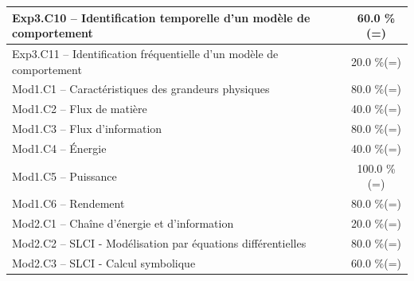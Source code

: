 \begin{center}
\begin{tabular}{|p{.7\linewidth}|c|}
Exp3.C10 -- Identification temporelle d’un modèle de comportement&60.0 \%(=)\\ \hline 
Exp3.C11 -- Identification fréquentielle d’un modèle de comportement&20.0 \%(=)\\ \hline 
Mod1.C1 -- Caractéristiques des grandeurs physiques&80.0 \%(=)\\ \hline 
Mod1.C2 -- Flux de matière&40.0 \%(=)\\ \hline 
Mod1.C3 -- Flux d’information&80.0 \%(=)\\ \hline 
Mod1.C4 -- Énergie&40.0 \%(=)\\ \hline 
Mod1.C5 -- Puissance&100.0 \%(=)\\ \hline 
Mod1.C6 -- Rendement&80.0 \%(=)\\ \hline 
Mod2.C1 -- Chaîne d’énergie et d'information&20.0 \%(=)\\ \hline 
Mod2.C2 -- SLCI - Modélisation par équations différentielles&80.0 \%(=)\\ \hline 
Mod2.C3 -- SLCI - Calcul symbolique&60.0 \%(=)\\ \hline 
\end{tabular} 
\end{center} 
\normalsize 
 
